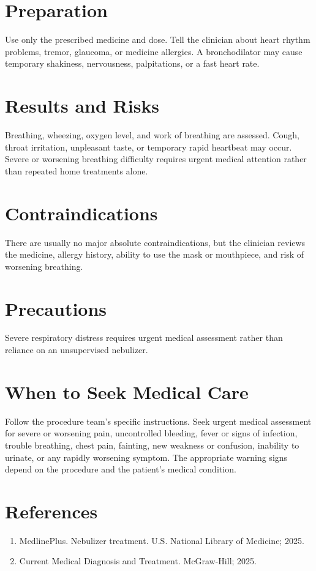 \section*{Preparation}
Use only the prescribed medicine and dose. Tell the clinician about heart rhythm problems, tremor, glaucoma, or medicine allergies. A bronchodilator may cause temporary shakiness, nervousness, palpitations, or a fast heart rate.

\section*{Results and Risks}
Breathing, wheezing, oxygen level, and work of breathing are assessed. Cough, throat irritation, unpleasant taste, or temporary rapid heartbeat may occur. Severe or worsening breathing difficulty requires urgent medical attention rather than repeated home treatments alone.

\section*{Contraindications}
There are usually no major absolute contraindications, but the clinician reviews the medicine, allergy history, ability to use the mask or mouthpiece, and risk of worsening breathing.

\section*{Precautions}
Severe respiratory distress requires urgent medical assessment rather than reliance on an unsupervised nebulizer.

\section*{When to Seek Medical Care}
Follow the procedure team's specific instructions. Seek urgent medical assessment for severe or worsening pain, uncontrolled bleeding, fever or signs of infection, trouble breathing, chest pain, fainting, new weakness or confusion, inability to urinate, or any rapidly worsening symptom. The appropriate warning signs depend on the procedure and the patient's medical condition.

\section*{References}
\begin{enumerate}
  \item MedlinePlus. Nebulizer treatment. U.S. National Library of Medicine; 2025.
  \item Current Medical Diagnosis and Treatment. McGraw-Hill; 2025.
\end{enumerate}
\clearpage
